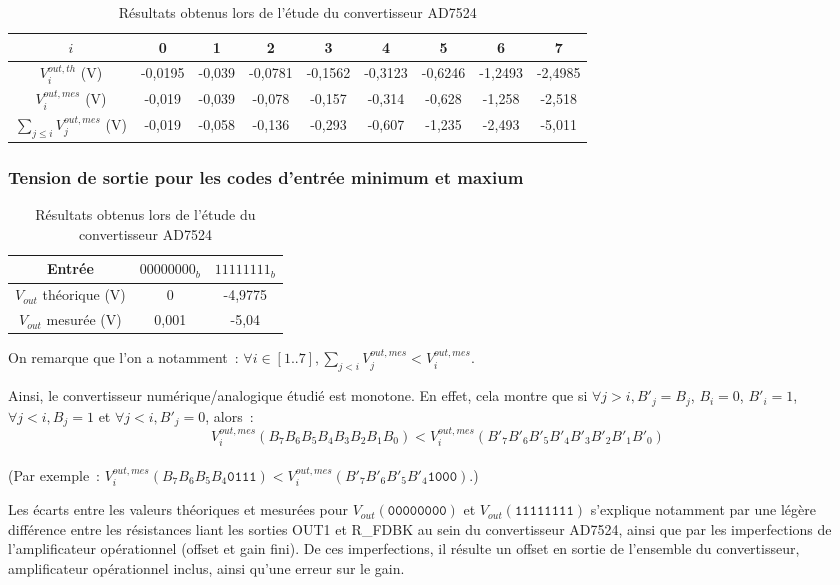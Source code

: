 \documentclass{article}
\begin{document}
\begin{table}[h]
\caption{Résultats obtenus lors de l'étude du convertisseur AD7524}
\label{tab:AD7524}
\centering

\begin{tabular}{|c|c|c|c|c|c|c|c|c|}
\hline
$i$ & 0 & 1 & 2 & 3 & 4 & 5 & 6 & 7 \\
\hline
$V_i^{out,th}$ (V) & -0,0195 & -0,039 & -0,0781 & -0,1562 & -0,3123 & -0,6246 & -1,2493 & -2,4985 \\
\hline
$V_i^{out,mes}$ (V) & -0,019 & -0,039 & -0,078 & -0,157 & -0,314 & -0,628 & -1,258 & -2,518 \\
\hline
$\sum_{j\leq i}V_j^{out,mes}$ (V) & -0,019 & -0,058 & -0,136 & -0,293 & -0,607 & -1,235 & -2,493 & -5,011 \\
\hline
\end{tabular}


\subsubsection{Tension de sortie pour les codes d'entrée minimum et maxium}


\begin{tabular}{|c|c|c|}
\hline
Entrée & \texttt{$00000000_b$} & \texttt{$11111111_b$} \\
\hline
$V_{out}$ théorique (V) & 0 & -4,9775 \\
\hline
$V_{out}$ mesurée (V) & 0,001 & -5,04 \\
\hline
\end{tabular}
\end{table}

On remarque que l'on a notamment~: $\forall i\in [1..7], \sum_{j<i}V_j^{out,mes} < V_i^{out,mes}$.

Ainsi, le convertisseur numérique/analogique étudié est monotone. En effet, cela montre que si ${\forall j>i, B'_j=B_j}$, $B_i=0$, $B'_i=1$, ${\forall j<i, B_j=1}$ et ${\forall j<i, B'_j=0}$, alors~: \begin{equation*}V_i^{out,mes}(B_7B_6B_5B_4B_3B_2B_1B_0) < V_i^{out,mes}(B'_7B'_6B'_5B'_4B'_3B'_2B'_1B'_0)\end{equation*} \\(Par exemple~: $V_i^{out,mes}(B_7B_6B_5B_4\mathtt{0111}) < V_i^{out,mes}(B'_7B'_6B'_5B'_4\mathtt{1000})$.)

Les écarts entre les valeurs théoriques et mesurées pour $V_{out}(\mathtt{00000000})$ et $V_{out}(\mathtt{11111111})$ s'explique notamment par une légère différence entre les résistances liant les sorties OUT1 et R\_FDBK au sein du convertisseur AD7524, ainsi que par les imperfections de l'amplificateur opérationnel (offset et gain fini). De ces imperfections, il résulte un offset en sortie de l'ensemble du convertisseur, amplificateur opérationnel inclus, ainsi qu'une erreur sur le gain.
\end{document}
